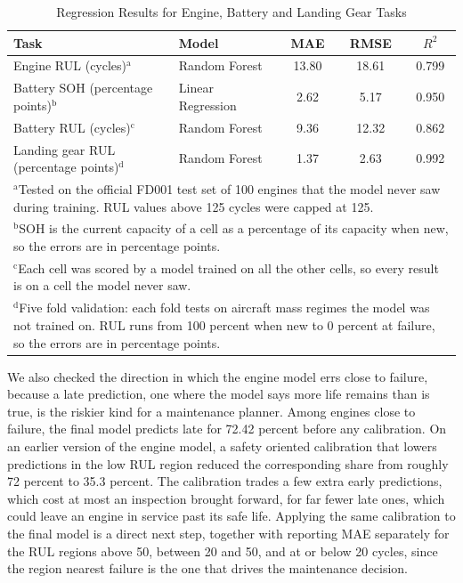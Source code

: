 \documentclass[conference]{IEEEtran}
\begin{document}
\begin{table}[htbp]
\caption{Regression Results for Engine, Battery and Landing Gear Tasks}
\begin{center}
\footnotesize
\setlength{\tabcolsep}{3pt}
\begin{tabular}{|p{0.95in}|p{0.8in}|c|c|c|}
\hline
\textbf{Task} & \textbf{Model} & \textbf{MAE} & \textbf{RMSE} & \textbf{$R^2$} \\
\hline
Engine RUL (cycles)$^{\mathrm{a}}$ & Random Forest & 13.80 & 18.61 & 0.799 \\
\hline
Battery SOH (percentage points)$^{\mathrm{b}}$ & Linear Regression & 2.62 & 5.17 & 0.950 \\
\hline
Battery RUL (cycles)$^{\mathrm{c}}$ & Random Forest & 9.36 & 12.32 & 0.862 \\
\hline
Landing gear RUL (percentage points)$^{\mathrm{d}}$ & Random Forest & 1.37 & 2.63 & 0.992 \\
\hline
\multicolumn{5}{p{3.05in}}{$^{\mathrm{a}}$Tested on the official FD001 test set of 100 engines that the model never saw during training. RUL values above 125 cycles were capped at 125.} \\
\multicolumn{5}{p{3.05in}}{$^{\mathrm{b}}$SOH is the current capacity of a cell as a percentage of its capacity when new, so the errors are in percentage points.} \\
\multicolumn{5}{p{3.05in}}{$^{\mathrm{c}}$Each cell was scored by a model trained on all the other cells, so every result is on a cell the model never saw.} \\
\multicolumn{5}{p{3.05in}}{$^{\mathrm{d}}$Five fold validation: each fold tests on aircraft mass regimes the model was not trained on. RUL runs from 100 percent when new to 0 percent at failure, so the errors are in percentage points.}
\end{tabular}
\label{tab_regression}
\end{center}
\end{table}

We also checked the direction in which the engine model errs close to failure, because a late prediction, one where the model says more life remains than is true, is the riskier kind for a maintenance planner. Among engines close to failure, the final model predicts late for 72.42 percent before any calibration. On an earlier version of the engine model, a safety oriented calibration that lowers predictions in the low RUL region reduced the corresponding share from roughly 72 percent to 35.3 percent. The calibration trades a few extra early predictions, which cost at most an inspection brought forward, for far fewer late ones, which could leave an engine in service past its safe life. Applying the same calibration to the final model is a direct next step, together with reporting MAE separately for the RUL regions above 50, between 20 and 50, and at or below 20 cycles, since the region nearest failure is the one that drives the maintenance decision.
\end{document}
